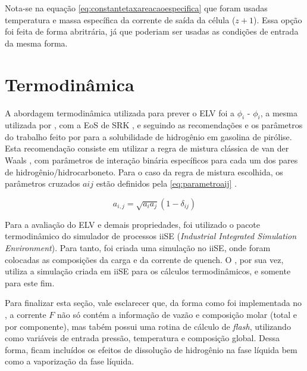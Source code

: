 Nota-se na equação \autoref{eq:constantetaxareacaoespecifica} que foram usadas
temperatura e massa específica da corrente de saída da célula ($z+1$). Essa
opção foi feita de forma abritrária, já que poderiam ser usadas as condições de
entrada da mesma forma.


\section{Termodinâmica} \label{sec:termodinamica}

A abordagem termodinâmica utilizada para prever o ELV foi a $\phi_i$ -
$\phi_i$, a mesma utilizada por , com a EoS de SRK
\cite{Soave1972}, e seguindo as recomendações e os parâmetros do trabalho feito
por  para a solubilidade de hidrogênio em gasolina de
pirólise. Esta recomendação consiste em utilizar a regra de mistura clássica de
van der Waals \cite{VanderWaals1873}, com parâmetros de interação binária
específicos para cada um dos pares de hidrogênio/hidrocarboneto. Para o caso da
regra de mistura escolhida, os parâmetros cruzados $aij$ estão definidos pela
\autoref{eq:parametroaij} \cite{Peng1976,Soave1972}.

\begin{equation}
a_{i,j} = \sqrt{a_ia_j}(1-\delta_{ij})
\label{eq:parametroaij}
\end{equation}

Para a avaliação do ELV e demais propriedades, foi utilizado o pacote
termodinâmico do simulador de processos iiSE (\emph{Industrial Integrated
Simulation Environment}). Para tanto, foi criada uma simulação no iiSE, onde
foram colocadas as composições da carga e da corrente de quench. O \emso, por
sua vez, utiliza a simulação criada em iiSE para os cálculos termodinâmicos, e
somente para este fim. 

Para finalizar esta seção, vale esclarecer que, da forma como foi implementada
no \emso, a corrente $F$ não só contém a informação de vazão e composição molar
(total e por componente), mas tabém possui uma rotina de cálculo de
\emph{flash}, utilizando como variáveis de entrada pressão, temperatura e
composição global. Dessa forma, ficam incluídos os efeitos de dissolução de
hidrogênio na fase líquida bem como a vaporização da fase líquida.

